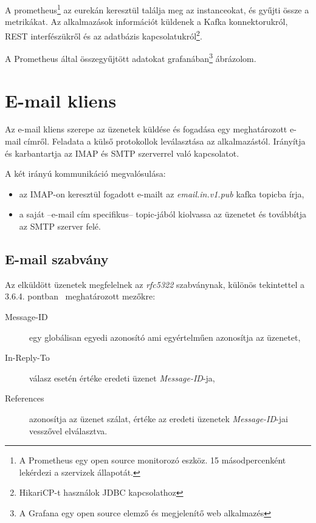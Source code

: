 A prometheus\footnote{A Prometheus egy open source monitorozó eszköz. 15 másodpercenként lekérdezi a szervizek állapotát.} az eurekán keresztül találja meg az instanceokat, és gyűjti össze a metrikákat. Az alkalmazások információt küldenek a Kafka konnektorukról, REST interfészükről és az adatbázis kapcsolatukról\footnote{HikariCP-t használok JDBC kapcsolathoz}.

A Prometheus által összegyűjtött adatokat grafanában\footnote{A Grafana egy open source elemző és megjelenítő web alkalmazés} ábrázolom.






\section{E-mail kliens}
Az e-mail kliens szerepe az üzenetek küldése és fogadása egy meghatározott e-mail címről. Feladata a külső protokollok leválasztása az alkalmazástól. Irányítja és karbantartja az IMAP és SMTP szerverrel való kapcsolatot.

A két irányú kommunikáció megvalósulása:
\begin{itemize}
	\item az IMAP-on keresztül fogadott e-mailt az \textit{email.in.v1.pub} kafka topicba írja,
	\item a saját --e-mail cím specifikus-- topic-jából kiolvassa az üzenetet és továbbítja  az SMTP szerver felé.
\end{itemize}


\subsection{E-mail szabvány}
Az elküldött üzenetek megfelelnek az \textit{rfc5322} szabványnak, különös tekintettel a 3.6.4. pontban~\cite{rfc5322_Identification_Fields} meghatározott mezőkre:

\begin{description}
	\item[Message-ID] egy globálisan egyedi azonosító ami egyértelműen azonosítja az üzenetet,
	
	\item[In-Reply-To] válasz esetén értéke eredeti üzenet \textit{Message-ID}-ja,
	
	\item[References] azonosítja az üzenet szálat, értéke az eredeti üzenetek \textit{Message-ID}-jai vesszővel elválasztva.
\end{description}




